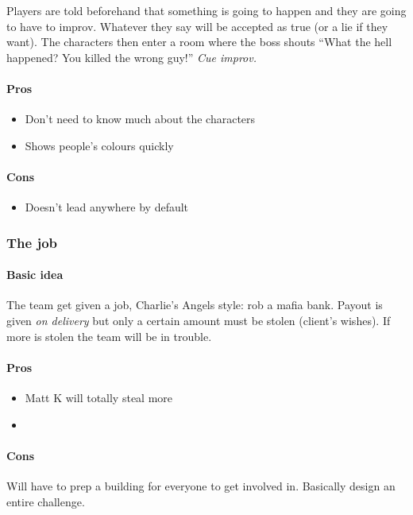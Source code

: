 \documentclass[a4paper,twocolumn,oneside]{memoir}
\begin{document}
Players are told beforehand that something is going to happen and they are going
to have to improv. Whatever they say will be accepted as true (or a lie if they
want). The characters then enter a room where the boss shouts ``What the hell
happened? You killed the wrong guy!'' \emph{Cue improv.}

\paragraph{Pros}

\begin{itemize}
\item Don't need to know much about the characters
\item Shows people's colours quickly
\end{itemize}

\paragraph{Cons}

\begin{itemize}
\item Doesn't lead anywhere by default
\end{itemize}


\subsubsection{The job}
\label{sec:job}

\paragraph{Basic idea}

The team get given a job, Charlie's Angels style: rob a mafia bank. Payout is
given \emph{on delivery} but only a certain amount must be stolen (client's
wishes). If more is stolen the team will be in trouble.

\paragraph{Pros}

\begin{itemize}
\item Matt K will totally steal more
\item 
\end{itemize}

\paragraph{Cons}

Will have to prep a building for everyone to get involved in. Basically design
an entire challenge.
\end{document}
